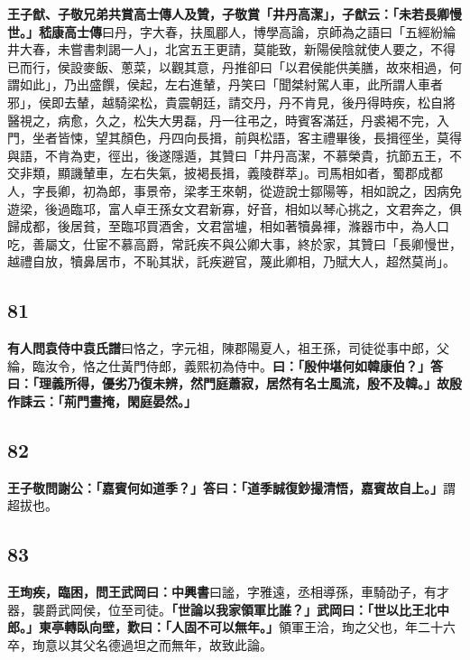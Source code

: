 \textbf{王子猷、子敬兄弟共賞高士傳人及贊，子敬賞「井丹高潔」，子猷云：「未若長卿慢世。」}{\footnotesize \textbf{嵇康高士傳}曰丹，字大春，扶風郿人，博學高論，京師為之語曰「五經紛綸井大春，未嘗書刺謁一人」，北宮五王更請，莫能致，新陽侯陰就使人要之，不得已而行，侯設麥飯、蔥菜，以觀其意，丹推卻曰「以君侯能供美膳，故來相過，何謂如此」，乃出盛饌，侯起，左右進輦，丹笑曰「聞桀紂駕人車，此所謂人車者邪」，侯即去輦，越騎梁松，貴震朝廷，請交丹，丹不肯見，後丹得時疾，松自將醫視之，病愈，久之，松失大男磊，丹一往弔之，時賓客滿廷，丹裘褐不完，入門，坐者皆悚，望其顏色，丹四向長揖，前與松語，客主禮畢後，長揖徑坐，莫得與語，不肯為吏，徑出，後遂隱遁，其贊曰「井丹高潔，不慕榮貴，抗節五王，不交非類，顯譏輦車，左右失氣，披褐長揖，義陵群萃」。司馬相如者，蜀郡成都人，字長卿，初為郎，事景帝，梁孝王來朝，從遊說士鄒陽等，相如說之，因病免遊梁，後過臨邛，富人卓王孫女文君新寡，好音，相如以琴心挑之，文君奔之，俱歸成都，後居貧，至臨邛買酒舍，文君當壚，相如著犢鼻褌，滌器市中，為人口吃，善屬文，仕宦不慕高爵，常託疾不與公卿大事，終於家，其贊曰「長卿慢世，越禮自放，犢鼻居市，不恥其狀，託疾避官，蔑此卿相，乃賦大人，超然莫尚」。}

\subsection*{81}

\textbf{有人問袁侍中}{\footnotesize \textbf{袁氏譜}曰恪之，字元祖，陳郡陽夏人，祖王孫，司徒從事中郎，父綸，臨汝令，恪之仕黃門侍郎，義熙初為侍中。}\textbf{曰：「殷仲堪何如韓康伯？」答曰：「理義所得，優劣乃復未辨，然門庭蕭寂，居然有名士風流，殷不及韓。」故殷作誄云：「荊門晝掩，閑庭晏然。」}

\subsection*{82}

\textbf{王子敬問謝公：「嘉賓何如道季？」答曰：「道季誠復鈔撮清悟，嘉賓故自上。」}{\footnotesize 謂超拔也。}

\subsection*{83}

\textbf{王珣疾，臨困，問王武岡曰：}{\footnotesize \textbf{中興書}曰謐，字雅遠，丞相導孫，車騎劭子，有才器，襲爵武岡侯，位至司徒。}\textbf{「世論以我家領軍比誰？」武岡曰：「世以比王北中郎。」東亭轉臥向壁，歎曰：「人固不可以無年。」}{\footnotesize 領軍王洽，珣之父也，年二十六卒，珣意以其父名德過坦之而無年，故致此論。}


